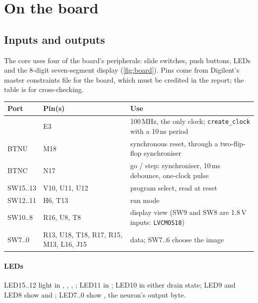 \section{On the board}\label{sec:board}


\subsection{Inputs and outputs}

The core uses four of the board's peripherals: slide switches, push buttons, LEDs and the 8-digit seven-segment display (\cref{fig:board}). Pins come from Digilent's master constraints file for the board, which must be credited in the report; the table is for cross-checking.

\begin{center}\small
\begin{tabularx}{\linewidth}{@{}l l L@{}}
\toprule
Port & Pin(s) & Use \\
\midrule
{} & E3 & 100\,MHz, the only clock; \texttt{create\_clock} with a 10\,ns period \\
BTNU & M18 & synchronous reset, through a two-flip-flop synchroniser \\
BTNC & N17 & go / step: synchroniser, 10\,ms debounce, one-clock pulse \\
SW15..13 & V10, U11, U12 & program select, read at reset \\
SW12..11 & H6, T13 & run mode \\
SW10..8 & R16, U8, T8 & display view (SW9 and SW8 are 1.8\,V inputs: \texttt{LVCMOS18}) \\
SW7..0 & R13, U18, T18, R17, R15, M13, L16, J15 &  data; SW7..6 choose the image \\
\bottomrule
\end{tabularx}
\end{center}

\paragraph{LEDs} LED15..12 light in , , , ; LED11 in ; LED10 in either drain state; LED9 and LED8 show  and ; LED7..0 show , the neuron's output byte.

